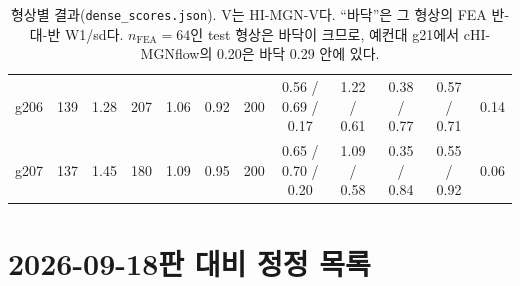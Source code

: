 \documentclass[11pt]{article}
\newcommand{\code}[1]{\texttt{#1}}
\begin{document}
\begin{table}[!htbp]
\begin{tabular}{@{}lrrrrrr ccccr@{}}
g206 & 139 & 1.28 & 207 & 1.06 & 0.92 & 200 & 0.56 / 0.69 / 0.17 & 1.22 / 0.61 & 0.38 / 0.77 & 0.57 / 0.71 & 0.14 \\
g207 & 137 & 1.45 & 180 & 1.09 & 0.95 & 200 & 0.65 / 0.70 / 0.20 & 1.09 / 0.58 & 0.35 / 0.84 & 0.55 / 0.92 & 0.06 \\
\bottomrule
\end{tabular}
\caption{형상별 결과(\code{dense\_scores.json}). V는 HI-MGN-V다. ``바닥''은
  그 형상의 FEA 반-대-반 W1/sd다. $n_{\text{FEA}}=64$인 test 형상은 바닥이
  크므로, 예컨대 g21에서 cHI-MGNflow의 0.20은 바닥 0.29 안에 있다.}
\label{tab:pergeom}
\end{table}

\section{2026-09-18판 대비 정정 목록}\label{app:errata}
\end{document}
